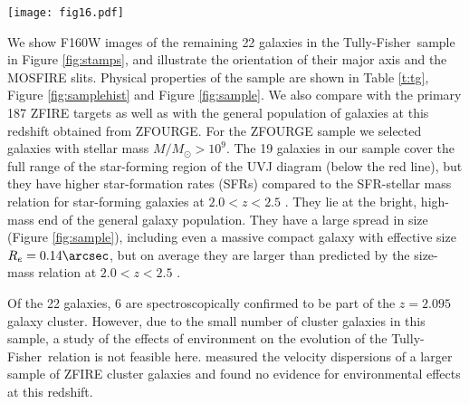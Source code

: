 \documentclass{emulateapj}
\newcommand{\msun}{$\mathrm{M_{\odot}}$}
\newcommand{\tf}{Tully-Fisher}
\begin{document}
\begin{figure*}
\begin{center}
\texttt{[image: fig16.pdf]}
\caption{Left: UVJ diagram of the ZFIRE sample (open symbols) and the {22} galaxies studied in this work (squares). The underlying histogram is the full distribution of $2.0<z<2.5$ galaxies with $M>10^9$\ \msun from ZFOURGE. This diagram separates quiescent galaxies from star-forming galaxies based on their rest-frame $U-V$ and $V-J$ colors, obtained from ZFOURGE photometry. The {22} galaxies in the sample span the full range in color typical of star-forming galaxies (region below the red line). Middle: stellar mass versus the logarithm of SFR. The orange line shows the median SFR as function of stellar mass of star-forming galaxies at $2.0<z<2.5$ \citep{Tomczak15}. Most of the galaxies in the sample are above the SFR-stellar mass relation at that redshift \citep{Tomczak15}. Right: stellar mass versus effective radius, with the size-mass relation at $2.0<z<2.5$ for star-forming galaxies shown as a blue line. The dashed lines are the corresponding 16th and 84th percentiles. Open square datapoints are flagged as suspicious or bad fits in the catalogs of \citet{vanderWel14a}. }
\label{fig:sample}
\end{center}
\end{figure*}

We show F160W images of the remaining {22} galaxies in the \tf\ sample in Figure \ref{fig:stamps}, and illustrate the orientation of their major axis and the MOSFIRE slits. Physical properties of the sample are shown in Table \ref{t:tg}, Figure \ref{fig:samplehist} and  Figure \ref{fig:sample}. We also compare with the primary 187 ZFIRE targets as well as with the general population of galaxies at this redshift obtained from ZFOURGE. For the ZFOURGE sample we selected galaxies with stellar mass $M/M_{\odot}>10^9$. The 19 galaxies in our sample cover the full range of the star-forming region of the UVJ diagram (below the red line), but they have higher star-formation rates (SFRs) compared to the SFR-stellar mass relation for star-forming galaxies at $2.0<z<2.5$ \citep{Tomczak15}. They lie at the bright, high-mass end of the general galaxy population. They have a large spread in size (Figure \ref{fig:sample}), including even a massive compact galaxy with effective size $R_e=0.14\arcsec$, but on average they are larger than predicted by the size-mass relation at $2.0<z<2.5$ \citep{vanderWel14a}. 

Of the {22} galaxies, 6 are spectroscopically confirmed to be part of the $z=2.095$ galaxy cluster. However, due to the small number of cluster galaxies {in this sample}, a study of the effects of environment on the evolution of the \tf\ relation is not feasible here. \citet{Alcorn16} measured the velocity dispersions of a larger sample of ZFIRE cluster galaxies and found no evidence for environmental effects at this redshift.
\end{document}
